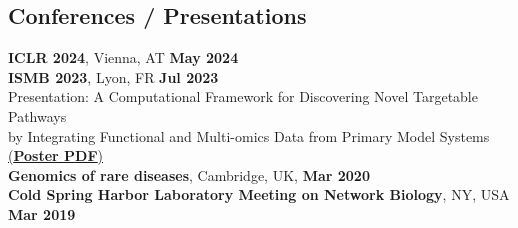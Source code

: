 \documentclass[margin,line]{resume}
\begin{document}
\begin{resume}
    \section{\mysidestyle Conferences / Presentations}
   \textbf{ICLR 2024}, Vienna, AT  \hfill \textbf{May 2024}\vspace{1mm}\\
 \textbf{ISMB 2023}, Lyon, FR  \hfill \textbf{Jul 2023}\vspace{1mm}\\
   Presentation: A Computational Framework for Discovering Novel Targetable Pathways \\ by Integrating Functional and Multi-omics Data from Primary Model Systems  \href{https://www.exscientia.com/wp-content/uploads/2024/01/ISMBECCB2023_1374_Buphamalai_poster.pdf}{(\textbf{Poster PDF})} 
   \vspace{1mm}\\
   \textbf{Genomics of rare diseases}, Cambridge, UK, \hfill \textbf{Mar 2020}\vspace{1mm}\\
   \textbf{Cold Spring Harbor Laboratory Meeting on Network Biology}, NY, USA  \hfill \textbf{Mar 2019}\vspace{1mm}\\

\end{resume}
\end{document}
